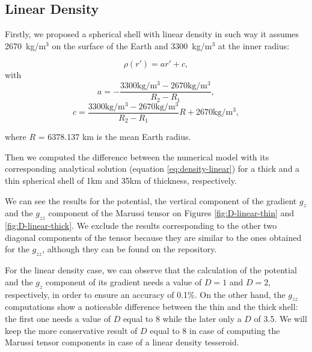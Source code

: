\documentclass[extra]{gji}
\begin{document}
\subsection{Linear Density}
Firstly,  we proposed a spherical shell with linear density in such way it assumes 2670~kg/m$^3$ on the surface of the Earth and 3300~kg/m$^3$ at the inner radius:

\begin{equation}
    \rho(r') = ar' + c,
    \label{eq:density-linear}
\end{equation}
\noindent with 
\begin{equation}
    a = -\frac{3300\text{kg/m$^3$} - 2670\text{kg/m$^3$}}{R_2 - R_1},
\end{equation}
\begin{equation}
    c = \frac{3300\text{kg/m$^3$} - 
        2670\text{kg/m$^3$}}{R_2 - R_1} R + 
        2670\text{kg/m$^3$},
\end{equation}

\noindent where $R$ = 6378.137 km is the mean Earth radius.

Then we computed the difference between the numerical model with its corresponding analytical solution (equation \ref{eq:density-linear}) for a thick and a thin spherical shell of 1km and 35km of thickness, respectively.

We can see the results for the potential, the vertical component of the gradient $g_z$ and the $g_{zz}$ component of the Marussi tensor on Figures \ref{fig:D-linear-thin} and \ref{fig:D-linear-thick}.
We exclude the results corresponding to the other two diagonal components of the tensor because they are similar to the ones obtained for the $g_{zz}$, although they can be found on the repository. 

For the linear density case, we can observe that the calculation of the potential and the $g_z$ component of its gradient needs a value of $D=1$ and $D=2$, respectively, in order to ensure an accuracy of 0.1\%.
On the other hand, the $g_{zz}$ computations show a noticeable difference between the thin and the thick shell: the first one needs a value of $D$ equal to 8 while the later only a $D$ of 3.5.
We will keep the more conservative result of $D$ equal to 8 in case of computing the Marussi tensor components in case of a linear density tesseroid.
\end{document}
